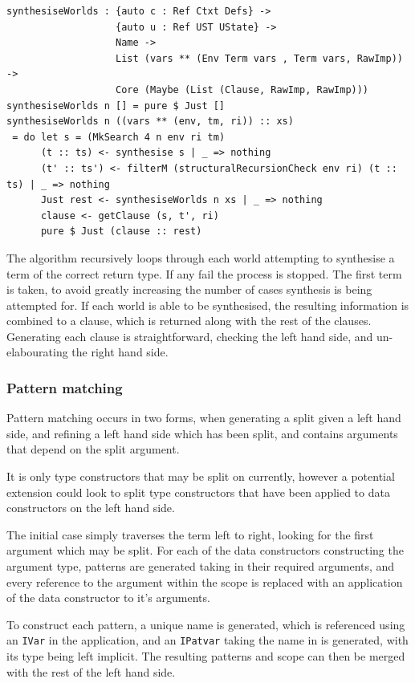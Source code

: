 \documentclass[a4paper]{article}
\begin{document}
\begin{center}
  \begin{verbatim}
synthesiseWorlds : {auto c : Ref Ctxt Defs} -> 
                   {auto u : Ref UST UState} -> 
                   Name ->
                   List (vars ** (Env Term vars , Term vars, RawImp)) ->
                   Core (Maybe (List (Clause, RawImp, RawImp)))
synthesiseWorlds n [] = pure $ Just []
synthesiseWorlds n ((vars ** (env, tm, ri)) :: xs)
 = do let s = (MkSearch 4 n env ri tm)
      (t :: ts) <- synthesise s | _ => nothing  
      (t' :: ts') <- filterM (structuralRecursionCheck env ri) (t :: ts) | _ => nothing
      Just rest <- synthesiseWorlds n xs | _ => nothing
      clause <- getClause (s, t', ri)
      pure $ Just (clause :: rest)
  \end{verbatim}
\end{center}

The algorithm recursively loops through each world attempting to synthesise a term of
the correct return type. If any fail the process is stopped. The first term is taken,
to avoid greatly increasing the number of cases synthesis is being attempted for. If
each world is able to be synthesised, the resulting information is combined to a
clause, which is returned along with the rest of the clauses. Generating each clause
is straightforward, checking the left hand side, and un-elabourating the right hand side.

\subsubsection{Pattern matching}

Pattern matching occurs in two forms, when generating a split given a
left hand side, and refining a left hand side which has been split,
and contains arguments that depend on the split argument.

It is only type constructors that may be split on currently,
however a potential extension could look to split type constructors
that have been applied to data constructors on the left hand side.

The initial case simply traverses the term left to right,
looking for the first argument which may be split.
For each of the data constructors constructing the argument type,
patterns are generated taking in their required arguments, and
every reference to the argument within the scope is replaced with an
application of the data constructor to it's arguments.

To construct each pattern, a unique name is generated, which is
referenced using an \texttt{IVar} in the application, and an
\texttt{IPatvar} taking the name in is generated, with its type being
left implicit. The resulting patterns and scope can then be merged
with the rest of the left hand side. 
\end{document}
